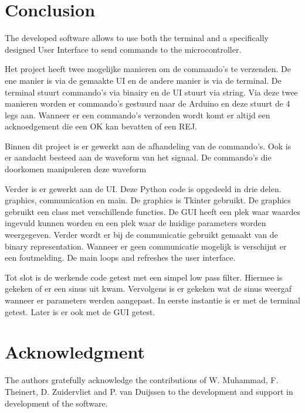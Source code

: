 \documentclass[conference]{IEEEtran}
\begin{document}
\section{Conclusion}
The developed software allows to use both the terminal and a specifically designed User Interface to send commands to the microcontroller.

Het project heeft twee mogelijke manieren om de commando's te verzenden. De ene manier is via de gemaakte UI en de andere manier is via de terminal. De terminal stuurt commando's via binairy en de UI stuurt via string. Via deze twee manieren worden er commando's gestuurd naar de Arduino en deze stuurt de 4 legs aan. Wanneer er een commando's verzonden wordt komt er altijd een acknoedgement die een OK kan bevatten of een REJ.  

Binnen dit project is er gewerkt aan de afhandeling van de commando's. Ook is er aandacht besteed aan de waveform van het signaal. De commando's die doorkomen manipuleren deze waveform

Verder is er gewerkt aan de UI. Deze Python code is opgedeeld in drie delen. graphics, communication en main. De graphics is Tkinter gebruikt. De graphics gebruikt een class met verschillende functies. De GUI heeft een plek waar waardes ingevuld kunnen worden en een plek waar de huidige parameters worden weergegeven. Verder wordt er bij de communicatie gebruikt gemaakt van de binary representation. Wanneer er geen communicatie mogelijk is verschijnt er een foutmelding. De main loops and refreshes the user interface. 

Tot slot is de werkende code getest met een simpel low pass filter. Hiermee is gekeken of er een sinus uit kwam. Vervolgens is er gekeken wat de sinus weergaf wanneer er parameters werden aangepast. In eerste instantie is er met de terminal getest. Later is er ook met de GUI getest.




\section*{Acknowledgment}
The authors gratefully acknowledge the contributions of W. Muhammad, F. Theinert, D. Zuidervliet and P. van Duijssen to the development and support in development of the software.
\end{document}

